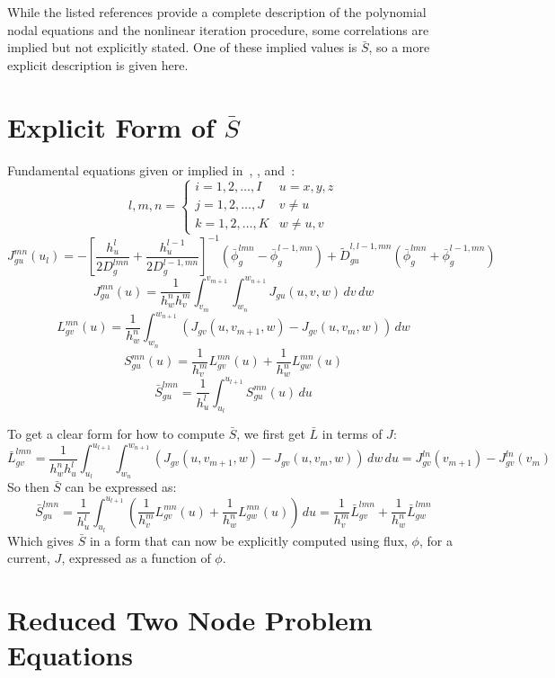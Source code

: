 While the listed references provide a complete description of the polynomial nodal equations and the nonlinear iteration procedure, some correlations are implied but not explicitly stated.
One of these implied values is $\bar{S}$, so a more explicit description is given here.

\section{Explicit Form of $\bar{S}$}
Fundamental equations given or implied in~\cite{GehinPhD}, \cite{SmithMS}, and~\cite{Smith1983Nonlinear}:
\[
l,m,n=\begin{cases}
i=1,2,\dots,I & u=x,y,z \\
j=1,2,\dots,J & v\neq u \\
k=1,2,\dots,K & w\neq u,v
\end{cases}
\]
\[
J_{gu}^{mn}(u_l)=-\left[\frac{h_u^l}{2D_g^{lmn}}+\frac{h_u^{l-1}}{2D_g^{l-1,mn}}\right]^{-1}\left(\bar{\phi}_g^{lmn}-\bar{\phi}_g^{l-1,mn}\right)+\tilde{D}_{gu}^{l,l-1,mn}\left(\bar{\phi}_g^{lmn}+\bar{\phi}_g^{l-1,mn}\right)
\]
\[
J_{gu}^{mn}(u)=\frac{1}{h_w^nh_v^m}\int_{v_m}^{v_{m+1}}\int_{w_n}^{w_{n+1}}J_{gu}(u,v,w)\,dv\,dw
\]
\[
L_{gv}^{mn}(u)=\frac{1}{h_w^n}\int_{w_n}^{w_{n+1}}\left(J_{gv}(u,v_{m+1},w)-J_{gv}(u,v_{m},w)\right)\,dw
\]
\[
S_{gu}^{mn}(u)=\frac{1}{h_v^m}L_{gv}^{mn}(u)+\frac{1}{h_w^n}L_{gw}^{mn}(u)
\]
\[
\bar{S}_{gu}^{lmn}=\frac{1}{h_u^l}\int_{u_l}^{u_{l+1}}S_{gu}^{mn}(u)\,du
\]

To get a clear form for how to compute $\bar{S}$, we first get $\bar{L}$ in terms of $J$:
\[
  \bar{L}_{gv}^{lmn}=\frac{1}{h_w^nh_u^l}\int_{u_l}^{u_{l+1}}\int_{w_n}^{w_{n+1}}\left(J_{gv}(u,v_{m+1},w)-J_{gv}(u,v_{m},w)\right)\,dw\,du=J_{gv}^{ln}(v_{m+1})-J_{gv}^{ln}(v_{m})
\]
So then $\bar{S}$ can be expressed as:
\[
  \bar{S}_{gu}^{lmn}=\frac{1}{h_u^l}\int_{u_l}^{u_{l+1}}\left(\frac{1}{h_v^m}L_{gv}^{mn}(u)+\frac{1}{h_w^n}L_{gw}^{mn}(u)\right)\,du=\frac{1}{h_v^m}\bar{L}_{gv}^{lmn}+\frac{1}{h_w^n}\bar{L}_{gw}^{lmn}
\]
Which gives $\bar{S}$ in a form that can now be explicitly computed using flux, $\phi$, for a current, $J$, expressed as a function of $\phi$.


\section{Reduced Two Node Problem Equations}

